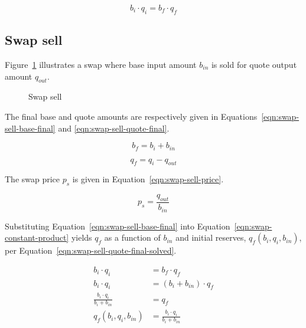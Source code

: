 \documentclass[table, twocolumn]{article}
\begin{document}
\begin{equation}\label{eqn:swap-constant-product}
	b_i \cdot q_i = b_f \cdot q_f
\end{equation}

\subsection{Swap sell}\label{ssec:swap-sell}

Figure~\ref{fig:swap-sell} illustrates a swap where base input amount $b_{in}$ is sold
for quote output amount $q_{out}$.

\begin{figure}[!htb]
	\centering
	
	\caption{Swap sell}\label{fig:swap-sell}
\end{figure}

The final base and quote amounts are respectively given in
Equations~\ref{eqn:swap-sell-base-final} and \ref{eqn:swap-sell-quote-final}.

\begin{equation}\label{eqn:swap-sell-base-final}
	b_f = b_i + b_{in}
\end{equation}

\begin{equation}\label{eqn:swap-sell-quote-final}
	q_f = q_i - q_{out}
\end{equation}

The swap price $p_s$ is given in Equation~\ref{eqn:swap-sell-price}.

\begin{equation}\label{eqn:swap-sell-price}
	p_s = \frac{q_{out}}{b_{in}}
\end{equation}

Substituting Equation~\ref{eqn:swap-sell-base-final} into
Equation~\ref{eqn:swap-constant-product} yields $q_f$ as a function of $b_{in}$ and
initial reserves, $q_f(b_i, q_i, b_{in})$, per
Equation~\ref{eqn:swap-sell-quote-final-solved}.

\begin{align}\label{eqn:swap-sell-quote-final-solved}
	b_i \cdot q_i                      & = b_f \cdot q_f \nonumber            \\
	b_i \cdot q_i                      & = (b_i + b_{in}) \cdot q_f \nonumber \\
	\frac{b_i \cdot q_i}{b_i + b_{in}} & = q_f \nonumber                      \\
	q_f(b_i, q_i, b_{in})              & = \frac{b_i \cdot q_i}{b_i + b_{in}}
\end{align}
\end{document}
